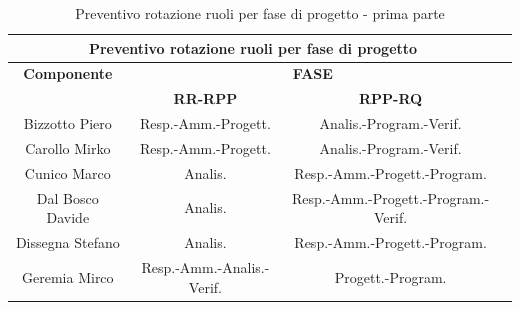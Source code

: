 \newpage

\begin{table}[!h]
	\begin{center}
		  \begin{tabular}
			  {|c|c|c|c|}
		 \hline
			\multicolumn{3}{|c|}{ \textbf{Preventivo rotazione ruoli per fase di progetto} } \\
			\hline
			\textbf{Componente} & \multicolumn{2}{|c|}{ \textbf{FASE} } \\
			\hline
			& \textbf{RR-RPP} & \textbf{RPP-RQ} \\
			\hline
			Bizzotto Piero & Resp.-Amm.-Progett.  & Analis.-Program.-Verif. \\
			\hline
			Carollo Mirko & Resp.-Amm.-Progett.  & Analis.-Program.-Verif.   \\
			\hline
			Cunico Marco & Analis.  & Resp.-Amm.-Progett.-Program.  \\
			\hline
			Dal Bosco Davide & Analis.  & Resp.-Amm.-Progett.-Program.-Verif.  \\
			\hline
			Dissegna Stefano & Analis.  & Resp.-Amm.-Progett.-Program.  \\
			\hline
			Geremia Mirco & Resp.-Amm.-Analis.-Verif.  & Progett.-Program.  \\
			\hline

		\end{tabular}
	\caption{Preventivo rotazione ruoli per fase di progetto - prima parte} %
	\label{tab:TabellaRotazRuoliUno}
	\end{center}	
\end{table}
